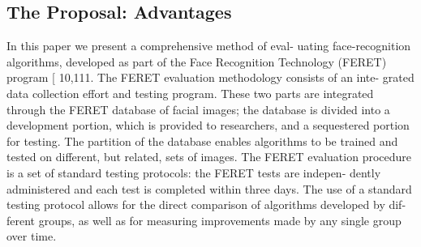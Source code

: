 \subsection{The Proposal: Advantages}
In this paper we present a comprehensive method of eval-
uating face-recognition
algorithms, developed as part of the
Face Recognition Technology (FERET) program [ 10,111.
The FERET evaluation methodology consists of an inte-
grated data collection effort and testing program. These
two parts are integrated through the FERET database of
facial images; the database is divided into a development
portion, which is provided to researchers, and a sequestered
portion for testing. The partition of the database enables
algorithms to be trained and tested on different, but related,
sets of images. The FERET evaluation procedure is a set of
standard testing protocols: the FERET tests are indepen-
dently administered
and each test is completed within
three days. The use of a standard testing protocol allows
for the direct comparison of algorithms developed by dif-
ferent groups, as well as for measuring improvements made
by any single group over time.